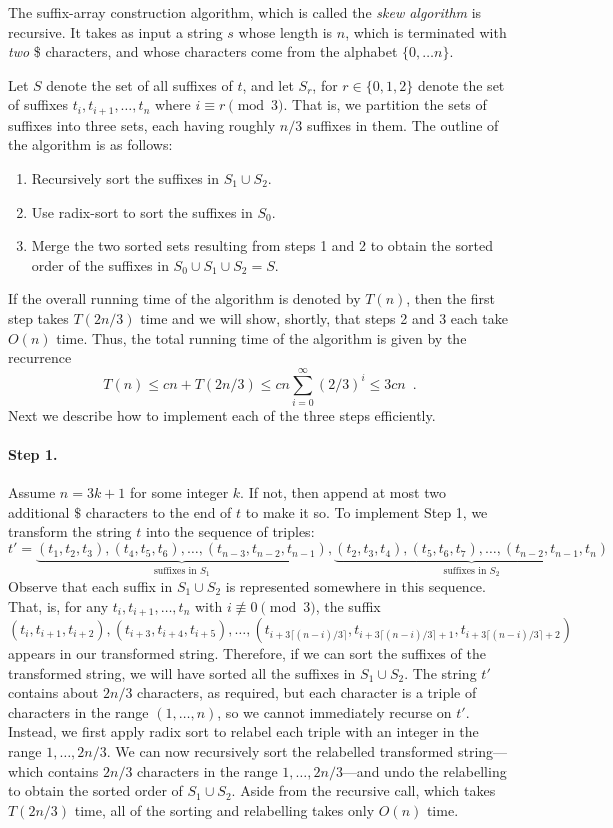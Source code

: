 The suffix-array construction algorithm, which is called the \emph{skew
algorithm} is recursive.  It takes as input a string $s$ whose length
is $n$, which is terminated with \emph{two} \$ characters, and whose
characters come from the alphabet $\{0,\ldots n\}$.

Let $S$ denote the set of all suffixes of $t$, and let $S_r$, for $r\in\{0,1,2\}$ denote the set of suffixes $t_i,t_{i+1},\ldots,t_n$ where $i\equiv r\pmod 3$.  That is, we partition the sets of suffixes into three sets, each having roughly $n/3$ suffixes in them.  The outline of the algorithm is as follows:

\begin{enumerate}
  \item Recursively sort the suffixes in $S_1\cup S_2$.
  \item Use radix-sort to sort the suffixes in $S_0$.
  \item Merge the two sorted sets resulting from steps 1 and 2 to obtain
     the sorted order of the suffixes in $S_0\cup S_1\cup S_2=S$.
\end{enumerate}
If the overall running time of the algorithm is denoted by $T(n)$, then the first step takes $T(2n/3)$ time and we will show, shortly, that steps 2 and 3 each take $O(n)$ time.  Thus, the total running time of the algorithm is given by the recurrence
\[
    T(n) \le cn + T(2n/3) \le cn\sum_{i=0}^\infty (2/3)^i \le 3cn \enspace .
\]
Next we describe how to implement each of the three steps efficiently.

\paragraph{Step 1.}
Assume $n=3k+1$ for some integer $k$. If not, then append at most two additional $\$$ characters to the end of $t$ to make it so.
To implement Step 1, we transform the string $t$ into the sequence of triples:
\[
   t'= \underbrace{(t_1,t_2,t_3),(t_4,t_5,t_6),\ldots,(t_{n-3},t_{n-2},t_{n-1})}_\text{suffixes in $S_1$},
   \underbrace{(t_2,t_3,t_4),(t_5,t_6,t_7),\ldots,(t_{n-2},t_{n-1},t_{n})}_\text{suffixes in $S_2$}
\]
Observe that each suffix in $S_1\cup S_2$ is represented somewhere in this sequence.  That, is, for any $t_i,t_{i+1},\ldots,t_n$ with $i\not\equiv 0\pmod 3$, the suffix
\[
   (t_i,t_{i+1},t_{i+2}),(t_{i+3},t_{i+4},t_{i+5}),\ldots,
       (t_{i+3\lceil(n-i)/3\rceil},t_{i+3\lceil(n-i)/3\rceil+1},
       t_{i+3\lceil(n-i)/3\rceil+2})
\]
appears in our transformed string. Therefore, if we can sort the suffixes
of the transformed string, we will have sorted all the suffixes in
$S_1\cup S_2$.  The string $t'$ contains about $2n/3$ characters, as
required, but each character is a triple of characters in the range
$(1,\ldots,n)$, so we cannot immediately recurse on $t'$.  Instead,
we first apply radix sort to relabel each triple with an integer in
the range $1,\ldots,2n/3$.  We can now recursively sort the relabelled
transformed string---which contains $2n/3$ characters in the range
$1,\ldots,2n/3$---and undo the relabelling to obtain the sorted order
of $S_1\cup S_2$.
Aside from the recursive call, which takes $T(2n/3)$ time, all of the sorting and relabelling takes only $O(n)$ time.

